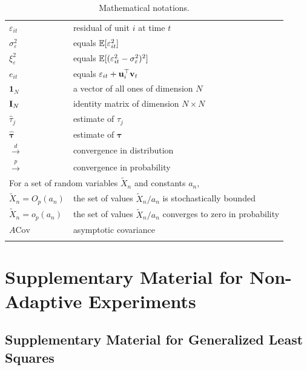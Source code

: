 \begin{longtable}{ll}
 $\varepsilon_{it}$ & residual of unit $i$ at time $t$ \\
 $\sigma_\varepsilon^2$ & equals $\mathbb{E}[\varepsilon^2_{it}]$ \\
 $\xi_\varepsilon^2$ & equals $\mathbb{E}[(\varepsilon^2_{it} - \sigma_\varepsilon^2)^2]$ \\
 $e_{it}$ & equals $\varepsilon_{it} + \mathbf{u}_i^\top \mathbf{v}_t$ \\
 $\bm{1}_N$ & a vector of all ones of dimension $N$ \\
 $\mathbf{I}_N$ & identity matrix of dimension $N \times N$\\
 $\hat{\tau}_j$ & estimate of $\tau_j$ \\
 $\hat{\bm{\tau}}$ & estimate of $\bm{\tau}$ \\
 $\xrightarrow{d}$ & convergence in distribution\\
 $\xrightarrow{p}$ & 
 convergence in probability \\
 \multicolumn{2}{l}{For a set of random variables $\tilde{X}_n$ and constants $a_n$,} \\
 $\tilde{X}_n = O_p(a_n)$ & the set of values $\tilde{X}_n/a_n$ is stochastically bounded \\ 
 $\tilde{X}_n = o_p(a_n)$ &  the set of values $\tilde{X}_n/a_n$ converges to zero in probability \\ 
 $A\mathrm{Cov}$ & asymptotic covariance\\
 \hline
 \caption{Mathematical notations.}
 \label{tab:notations}
    \end{longtable}


    \newpage

    \setcounter{tocdepth}{2}


    
    \tableofcontents

    \newpage
  
  \section{Supplementary Material for Non-Adaptive Experiments}\label{sec:constant-appendix}
		

		
		\subsection{Supplementary Material for Generalized Least Squares}\label{subsec:gls-carryover}
		
